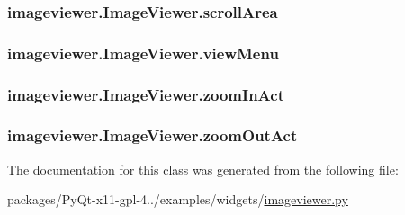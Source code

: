 \subsubsection[{scroll\+Area}]{\setlength{\rightskip}{0pt plus 5cm}imageviewer.\+Image\+Viewer.\+scroll\+Area}\label{classimageviewer_1_1ImageViewer_a3f986289538498c0afe145e1890ac9c9}
\hypertarget{classimageviewer_1_1ImageViewer_a1bc91a67c3135cc6cbbd173bbff4edc7}{}
\subsubsection[{view\+Menu}]{\setlength{\rightskip}{0pt plus 5cm}imageviewer.\+Image\+Viewer.\+view\+Menu}\label{classimageviewer_1_1ImageViewer_a1bc91a67c3135cc6cbbd173bbff4edc7}
\hypertarget{classimageviewer_1_1ImageViewer_ab573b4ead34e2669c38926b9bfdbf87b}{}
\subsubsection[{zoom\+In\+Act}]{\setlength{\rightskip}{0pt plus 5cm}imageviewer.\+Image\+Viewer.\+zoom\+In\+Act}\label{classimageviewer_1_1ImageViewer_ab573b4ead34e2669c38926b9bfdbf87b}
\hypertarget{classimageviewer_1_1ImageViewer_acab3c91b1789f258606f1071a49238dc}{}
\subsubsection[{zoom\+Out\+Act}]{\setlength{\rightskip}{0pt plus 5cm}imageviewer.\+Image\+Viewer.\+zoom\+Out\+Act}\label{classimageviewer_1_1ImageViewer_acab3c91b1789f258606f1071a49238dc}


The documentation for this class was generated from the following file\+:\begin{DoxyCompactItemize}
\item 
packages/\+Py\+Qt-\/x11-\/gpl-\/4../examples/widgets/\hyperlink{imageviewer_8py}{imageviewer.\+py}\end{DoxyCompactItemize}

